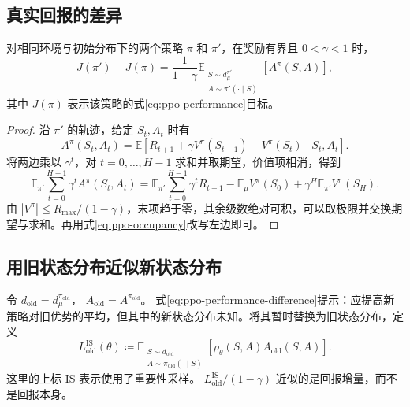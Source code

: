 \documentclass[UTF8]{ctexart}
\begin{document}
\subsection{真实回报的差异}

\begin{proposition}[性能差异恒等式]
\label{prop:ppo-performance-difference}
对相同环境与初始分布下的两个策略 $\pi$ 和 $\pi'$，在奖励有界且 $0<\gamma<1$ 时，
\begin{equation}
  J(\pi')-J(\pi)
  =\frac1{1-\gamma}
    \mathbb E_{\substack{S\sim d^{\pi'}_\mu\\A\sim\pi'(\cdot\mid S)}}
      [A^\pi(S,A)],
  \label{eq:ppo-performance-difference}
\end{equation}
其中 $J(\pi)$ 表示该策略的式\eqref{eq:ppo-performance}目标。
\end{proposition}

\begin{proof}
沿 $\pi'$ 的轨迹，给定 $S_t,A_t$ 时有
\[
  A^\pi(S_t,A_t)
  =\mathbb E[R_{t+1}+\gamma V^\pi(S_{t+1})
             -V^\pi(S_t)\mid S_t,A_t].
\]
将两边乘以 $\gamma^t$，对 $t=0,\ldots,H-1$ 求和并取期望，价值项相消，得到
\[
  \mathbb E_{\pi'}\sum_{t=0}^{H-1}\gamma^tA^\pi(S_t,A_t)
  =\mathbb E_{\pi'}\sum_{t=0}^{H-1}\gamma^tR_{t+1}
    -\mathbb E_\mu V^\pi(S_0)
    +\gamma^H\mathbb E_{\pi'}V^\pi(S_H).
\]
由 $|V^\pi|\le R_{\max}/(1-\gamma)$，末项趋于零，其余级数绝对可积，可以取极限并交换期望与求和。再用式\eqref{eq:ppo-occupancy}改写左边即可。
\end{proof}

\subsection{用旧状态分布近似新状态分布}

令
$d_{\mathrm{old}}=d^{\pi_{\mathrm{old}}}_\mu$，
$A_{\mathrm{old}}=A^{\pi_{\mathrm{old}}}$。
式\eqref{eq:ppo-performance-difference}提示：应提高新策略对旧优势的平均，但其中的新状态分布未知。将其暂时替换为旧状态分布，定义
\begin{equation}
  L_{\mathrm{old}}^{\mathrm{IS}}(\theta)
  \coloneqq
  \mathbb E_{\substack{S\sim d_{\mathrm{old}}\\
                      A\sim\pi_{\mathrm{old}}(\cdot\mid S)}}
  [\rho_\theta(S,A)A_{\mathrm{old}}(S,A)].
  \label{eq:ppo-population-surrogate}
\end{equation}
这里的上标 $\mathrm{IS}$ 表示使用了重要性采样。
$L_{\mathrm{old}}^{\mathrm{IS}}/(1-\gamma)$ 近似的是回报增量，而不是回报本身。
\end{document}
